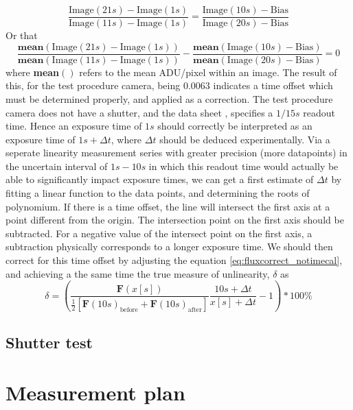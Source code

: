 \documentclass[../main.tex]{subfiles}
\begin{document}
		\begin{equation}
			\frac{\text{Image}(21s) - \text{Image}(1s)}{\text{Image}(11s) - \text{Image}(1s)} = \frac{\text{Image}(10s) - \text{Bias}}{\text{Image}(20s) - \text{Bias}}
		\end{equation}
		Or that 
		\begin{equation}
			\frac{\textbf{mean}(\text{Image}(21s) - \text{Image}(1s))}{\textbf{mean}(\text{Image}(11s) - \text{Image}(1s))} - \frac{\textbf{mean}(\text{Image}(10s) - \text{Bias})}{\textbf{mean}(\text{Image}(20s) - \text{Bias})} = 0
		\end{equation}
		where \textbf{mean}$()$ refers to the mean ADU/pixel within an image. The result of this, for the test procedure camera, being $0.0063$ indicates a time offset which must be determined properly, and applied as a correction. The test procedure camera does not have a shutter, and the data sheet \cite{atik414specs}, specifies a $1/15 s$ readout time. Hence an exposure time of $1s$ should correctly be interpreted as an exposure time of $1s + \Delta t$, where $\Delta t$ should be deduced experimentally. Via a seperate linearity measurement series with greater precision (more datapoints) in the uncertain interval of $1s - 10s$ in which this readout time would actually be able to significantly impact exposure times, we can get a first estimate of $\Delta t$ by fitting a linear function to the data points, and determining the roots of polynomium. If there is a time offset, the line will intersect the first axis at a point different from the origin. The intersection point on the first axis should be subtracted. For a negative value of the intersect point on the first axis, a subtraction physically corresponds to a longer exposure time. We should then correct for this time offset by adjusting the equation \ref{eq:fluxcorrect_notimecal}, and achieving a the same time the true measure of unlinearity, $\delta$ as
		\begin{equation}\label{eq:fluxcorrect_timecal}
		\delta = \left( \frac{\bm F(x [s])}{\frac12\left[\bm F(10s)_\text{before}+\bm F(10s)_\text{after}\right]}\frac{10s + \Delta t}{x [s] + \Delta t} - 1 \right) * 100\%
		\end{equation}
		
		\subsection{Shutter test}
		
		
		
		\section{Measurement plan}
		
\end{document}
